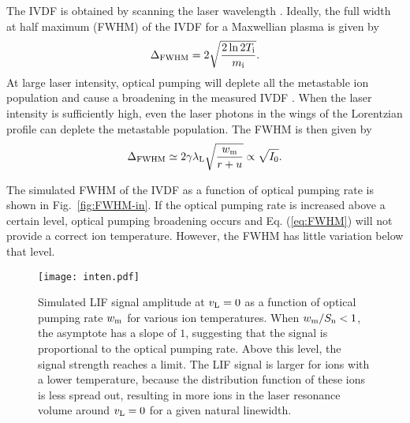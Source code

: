 \documentclass[aip,pop,reprint]{revtex4-1}
\begin{document}
The IVDF is obtained by scanning the laser wavelength \cite{mattingly_measurement_2013}. Ideally, the full width at half maximum (FWHM) of the IVDF for a Maxwellian plasma is given by \cite{goeckner_laserinduced_1989}
\begin{equation}
\label{eq:FWHM}
\Delta _{\textup{FWHM}}=2\sqrt{ \frac{2\ln{2} T_\textup{i}}{m_\textup{i}} }.
\end{equation}
At large laser intensity, optical pumping will deplete all the metastable ion population and cause a broadening in the measured IVDF \cite{klimcak_optical-pumping_1984}. When the laser intensity is sufficiently high, even the laser photons in the wings of the Lorentzian profile can deplete the metastable population. The FWHM is then given by %
\begin{equation}
\label{eq:FWHM2}
\Delta _{\textup{FWHM}}\simeq  2\gamma \lambda_\textup{L}\sqrt{\frac{w_\textup{m}}{r+u}}\propto \sqrt{I_0}.
\end{equation}

The simulated FWHM of the IVDF as a function of optical pumping rate is shown in Fig.~\ref{fig:FWHM-in}. If the optical pumping rate is increased above a certain level, optical pumping broadening occurs and Eq. (\ref{eq:FWHM}) will not provide a correct ion temperature. However, the FWHM has little variation below that level.  

\begin{figure}[t]
\begin{center}
\texttt{[image: inten.pdf]}
\caption{Simulated LIF signal amplitude at $v_\textup{L}=0$ as a function of optical pumping rate $w_\textup{m}$ for various ion temperatures. When $w_\textup{m}/S_\textup{n}<1$, the asymptote has a slope of $1$, suggesting that the signal is proportional to the optical pumping rate. Above this level, the signal strength reaches a limit. The LIF signal is larger for ions with a lower temperature, because the distribution function of these ions is less spread out, resulting in more ions in the laser resonance volume around $v_\textup{L}=0$ for a given natural linewidth.}
\label{fig:inten}
\end{center}
\end{figure}
\end{document}
